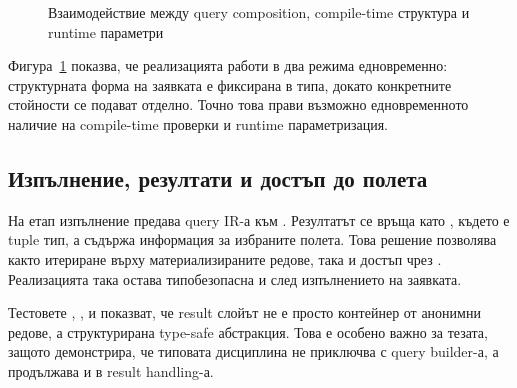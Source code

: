 \begin{figure}[H]
\centering
{}
\caption{Взаимодействие между query composition, compile-time структура и runtime параметри}
\label{fig:query_composition_execution}
\end{figure}

Фигура~\ref{fig:query_composition_execution} показва, че реализацията работи в два режима едновременно: структурната форма на заявката е фиксирана в типа, докато конкретните стойности се подават отделно. Точно това прави възможно едновременното наличие на compile-time проверки и runtime параметризация.

\subsection{Изпълнение, резултати и достъп до полета}

На етап изпълнение  предава query IR-а към . Резултатът се връща като , където  е tuple тип, а  съдържа информация за избраните полета. Това решение позволява както итериране върху материализираните редове, така и достъп чрез . Реализацията така остава типобезопасна и след изпълнението на заявката.

Тестовете , ,  и  показват, че result слойът не е просто контейнер от анонимни редове, а структурирана type-safe абстракция. Това е особено важно за тезата, защото демонстрира, че типовата дисциплина не приключва с query builder-а, а продължава и в result handling-а.

